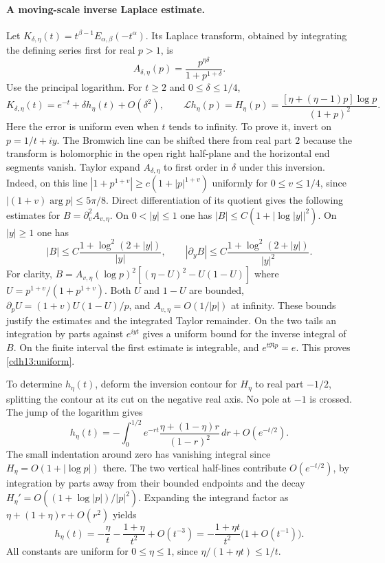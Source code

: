 \documentclass[11pt,a4paper]{article}
\numberwithin{equation}{section}
\begin{document}
\paragraph{A moving-scale inverse Laplace estimate.}
Let $K_{\delta,\eta}(t)=t^{\beta-1}E_{\alpha,\beta}(-t^\alpha)$.
Its Laplace transform, obtained by integrating the defining series
first for real $p>1$, is
\[
 A_{\delta,\eta}(p)=\frac{p^{\eta\delta}}{1+p^{1+\delta}}.
\]
Use the principal logarithm. For $t\ge2$ and $0\le\delta\le 1/4$,
\begin{equation}\label{cdh13:uniform}
 K_{\delta,\eta}(t)=e^{-t}+\delta h_\eta(t)+O(\delta^2),\qquad
 \mathcal L h_\eta(p)=H_\eta(p)=
 \frac{[\eta+(\eta-1)p]\log p}{(1+p)^2}.
\end{equation}
Here the error is uniform even when $t$ tends to infinity.
To prove it, invert on $p=1/t+iy$. The Bromwich line can be shifted
there from real part $2$ because the transform is holomorphic in
the open right half-plane and the horizontal end segments vanish.
Taylor expand $A_{\delta,\eta}$ to first order in $\delta$ under
this inversion. Indeed, on this line
$|1+p^{1+v}|\ge c(1+|p|^{1+v})$ uniformly for $0\le v\le1/4$,
since $|(1+v)\arg p|\le5\pi/8$. Direct differentiation of its
quotient gives the following estimates for $B=\partial_v^2A_{v,\eta}$.
On $0<|y|\le1$ one has $|B|\le C(1+|\log|y||^2)$. On $|y|\ge1$
one has
\[
 |B|\le C\frac{1+\log^2(2+|y|)}{|y|},\qquad
 |\partial_y B|\le C\frac{1+\log^2(2+|y|)}{|y|^2}.
\]
For clarity, $B=A_{v,\eta}(\log p)^2[(\eta-U)^2-U(1-U)]$
where $U=p^{1+v}/(1+p^{1+v})$. Both $U$ and $1-U$ are bounded,
$\partial_pU=(1+v)U(1-U)/p$, and $A_{v,\eta}=O(1/|p|)$ at infinity.
These bounds justify the estimates and the integrated Taylor remainder.
On the two tails an integration by parts against $e^{iyt}$ gives
a uniform bound for the inverse integral of $B$. On the finite
interval the first estimate is integrable, and $e^{t\Re p}=e$.
This proves \eqref{cdh13:uniform}.

To determine $h_\eta(t)$, deform the inversion contour for $H_\eta$
to real part $-1/2$, splitting the contour at its cut on the negative
real axis. No pole at $-1$ is crossed. The jump of the logarithm gives
\[
 h_\eta(t)=-\int_0^{1/2}e^{-rt}
 \frac{\eta+(1-\eta)r}{(1-r)^2}\,dr+O(e^{-t/2}).
\]
The small indentation around zero has vanishing integral since
$H_\eta=O(1+|\log p|)$ there. The two vertical half-lines contribute
$O(e^{-t/2})$, by integration by parts away from their bounded
endpoints and the decay $H_\eta'=O((1+\log|p|)/|p|^2)$.
Expanding the integrand factor as $\eta+(1+\eta)r+O(r^2)$ yields
\[
 h_\eta(t)=-\frac{\eta}{t}-\frac{1+\eta}{t^2}+O(t^{-3})
  =-\frac{1+\eta t}{t^2}\bigl(1+O(t^{-1})\bigr).
\]
All constants are uniform for $0\le\eta\le1$, since
$\eta/(1+\eta t)\le1/t$.
\end{document}
